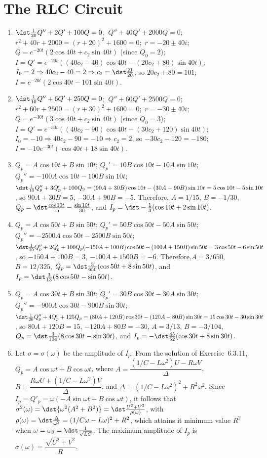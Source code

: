 \documentclass[openany]{book}
\newenvironment{sectionSolutions}{
 \begin{enumerate}[item-label={\thesection.\arabic{enumi}.}]
}{
 \end{enumerate}
}
\begin{document}
\section{The RLC Circuit}

\begin{sectionSolutions}
\item
$\dst\frac{1}{20}Q''+2Q'+100Q=0$;\, $Q''+40Q'+2000Q=0$;\,
$r^2+40r+2000=(r+20)^2+1600=0$;\,
$r=-20\pm40i$;\,
$Q=e^{-20t}(2\cos40t+c_2\sin40t)$ (since $Q_0=2$);\,
$I=Q'=e^{-20t}\left((40c_2-40)\cos40t-(20c_2+80)\sin40t\right)$;\,
$I_0=2\Rightarrow 40c_2-40=2\Rightarrow c_2=\dst\frac{21}{20}$,
so $20c_2+80=101$;\,
$I=e^{-20t}(2\cos40t-101\sin40t)$.



\item
$\dst\frac{1}{10}Q''+6Q'+250Q=0$;\, $Q''+60Q'+2500Q=0$;\,
$r^2+60r+2500=(r+30)^2+1600=0$;\,
$r=-30\pm40i$;\,
$Q=e^{-30t}(3\cos40t+c_2\sin40t)$ (since $Q_0=3$);\,
$I=Q'=e^{-30t}\left((40c_2-90)\cos40t-(30c_2+120)\sin40t\right)$;\,
$I_0=-10\Rightarrow 40c_2-90=-10\Rightarrow c_2=2$,
so $-30c_2-120=-180$;\,
$I=-10e^{-30t}(\cos40t+18\sin40t)$.


\item
$Q_p=A\cos10t+B\sin10t$;
$Q_p'=10B\cos10t-10A\sin10t$;
$Q_p''=-100A\cos10t-100B\sin10t$;
$\dst\frac{1}{10}Q_p''+3Q_p'+100Q_9=
(90A+30B)\cos10t-(30A-90B)\sin10t=5\cos10t-5\sin10t$,
so $90A+30B=5$, $-30A+90B=-5$. Therefore, $A=1/15$, $B=-1/30$,
$Q_p=\dst\frac{\cos10t}{15}-\frac{\sin10t}{30}$, and
$I_p=\dst-\frac{1}{3}(\cos10t+2\sin10t)$.


\item
$Q_p=A\cos 50t+B\sin 50t$;
$Q_p'=50B\cos 50t-50A\sin 50t$;
$Q_p''=-2500A\cos 50t-2500B\sin 50t$;
$\dst\frac{1}{10}Q_p''+2Q_p'+100Q_p
(-150A+100B)\cos 50t-(100A+150B)\sin 50t=3\cos50t-6\sin50t$,
so $-150A+100B=3$, $-100A+1500B=-6$. Therefore,$A=3/650$,
$B=12/325$, $Q_p=\dst\frac{3}{650}(\cos50t+8\sin50t)$, and
$I_p= \dst\frac{3}{13}(8\cos50t-\sin50t)$.


\item
$Q_p=A\cos 30t+B\sin 30t$;
$Q_p'=30B\cos 30t-30A\sin 30t$;
$Q_p''=-900A\cos 30t-900B\sin 30t$;
$\dst\frac{1}{20}Q_p''+4Q_p'+125Q_p=
(80A+120B)\cos 30t-(120A-80B)\sin 30t=15\cos30t-30\sin30t$, so
$80A+120B=15$, $-120A+80B=-30$,
$A=3/13$, $B=-3/104$,
$Q_p=
\dst\frac{3}{104}(8\cos 30t-\sin 30t)$, and
$I_p=-\dst\frac{45}{52}(\cos30t+8\sin30t)$.


\item
Let $\sigma=\sigma(\omega)$ be the amplitude of $I_p$.
From the solution of  Exercise~6.3.11,
$Q_p=A\cos\omega t+B\cos\omega t$, where
$A=\dfrac{(1/C-L\omega^2)U-R\omega V}{\Delta}$,
$B=\dfrac{R\omega U+(1/C-L\omega^2)V}{\Delta}$,  and
$\Delta=(1/C-L\omega^2)^2+R^2\omega^2$. Since
$I_p=Q'_p=\omega(-A\sin\omega t+B\cos\omega t)$, it follows that
$\sigma^2(\omega)=\dst{\omega^2(A^2+B^2)}=\dst\frac{U^2+V^2}{\rho(\omega)}$,
with
$\rho(\omega)=\dst\frac{\Delta}{\omega^2}=(1/C\omega-L\omega)^2+R^2$,
which attains it minimum value $R^2$ when
$\omega=\omega_0=\dst\frac{1}{\sqrt{LC}}$. The maximum amplitude of
$I_p$ is
$\sigma(\omega)=\dfrac{\sqrt{U^2+V^2}}{ R}$.
\end{sectionSolutions}
\end{document}
